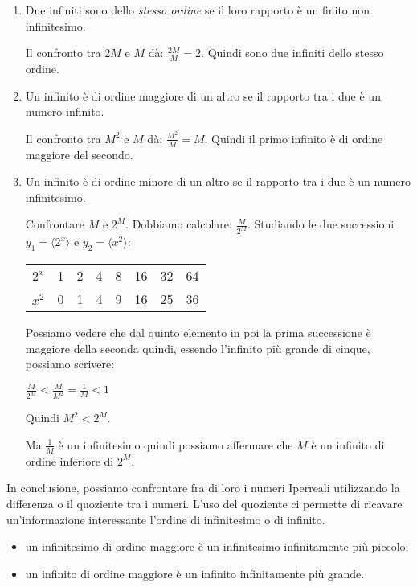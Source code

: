 \begin{enumerate}
 \item Due infiniti sono dello \emph{stesso ordine} se il loro rapporto è un 
finito non infinitesimo.
\begin{esempio}
 Il confronto tra $2M$ e $M$ dà: $\frac{2M}{M} = 2$. Quindi sono due infiniti 
dello stesso ordine.
\end{esempio}
 \item Un infinito è di ordine maggiore di un altro se il rapporto tra i due è 
un numero infinito.
\begin{esempio}
 Il confronto tra $M^2$ e $M$ dà: $\frac{M^2}{M} = M$. Quindi il primo infinito 
è di ordine maggiore del secondo.
\end{esempio}
 \item Un infinito è di ordine minore di un altro se il rapporto tra i due è 
un numero infinitesimo.
\begin{esempio}
 Confrontare $M$ e $2^M$. Dobbiamo calcolare: $\frac{M}{2^M}$. 
Studiando le due successioni 
$y_1=\langle 2^x \rangle$ e $y_2=\langle x^2 \rangle$:
\begin{center}
\begin{tabular}{cccccccc}
$2^x$ & 1 & 2 & 4 & 8 & 16 & 32 & 64\\
$x^2$ & 0 & 1 & 4 & 9 & 16 & 25 & 36
\end{tabular}
\end{center}
Possiamo vedere che dal quinto elemento in poi la prima successione è maggiore 
della seconda quindi, essendo l'infinito più grande di cinque, possiamo 
scrivere:

$\frac{M}{2^M} < \frac{M}{M^2} = \frac{1}{M} < 1$

Quindi $M^2 < 2^M$.

Ma $\frac{1}{M}$ è un infinitesimo quindi possiamo affermare che $M$ è un 
infinito di ordine inferiore di $2^M$.
\end{esempio}
\end{enumerate}

In conclusione, possiamo confrontare fra di loro i numeri Iperreali utilizzando 
la differenza o il quoziente tra i numeri. L'uso del quoziente ci permette di 
ricavare un'informazione interessante l'ordine di infinitesimo o di infinito.
\begin{itemize} [noitemsep]
 \item un infinitesimo di ordine maggiore è un infinitesimo infinitamente più 
piccolo;
 \item un infinito di ordine maggiore è un infinito infinitamente più 
grande.
\end{itemize}


